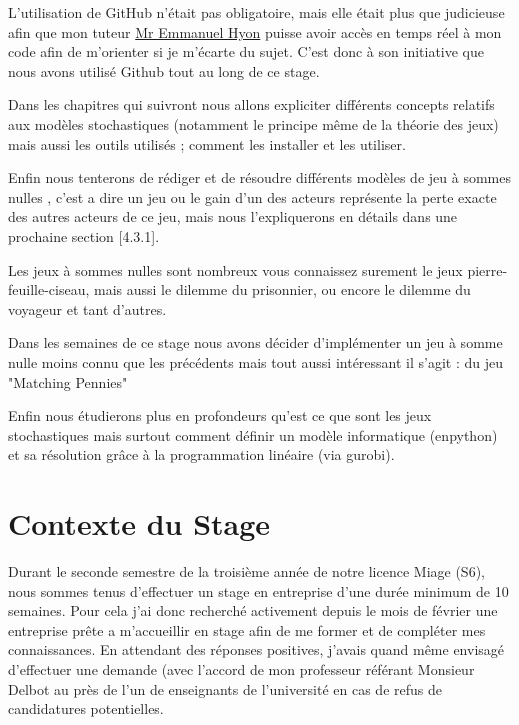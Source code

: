 \documentclass[a4paper, 12pt, twoside]{article}
\begin{document}
L'utilisation de \textsf{GitHub} n'était pas obligatoire, mais elle était plus que judicieuse afin que mon tuteur \underline{\textsf{Mr Emmanuel Hyon}} puisse avoir accès en temps réel à mon code afin de m'orienter si je m'écarte du sujet. C'est donc à son initiative que nous avons utilisé \textsf{Github} tout au long de ce stage. \newline

Dans les chapitres qui suivront nous allons expliciter différents concepts relatifs aux \textsf{ modèles stochastiques} (notamment le principe même de la théorie des jeux) mais aussi les outils utilisés ; comment les installer et les utiliser. \newline

Enfin nous tenterons de rédiger et de résoudre différents modèles de \textsf{jeu à sommes nulles} , c'est a dire un jeu ou le gain d'un des acteurs représente la perte exacte des autres acteurs de ce jeu, mais nous l'expliquerons en détails dans une prochaine section [4.3.1].  \newline

Les \textsf{jeux à sommes nulles} sont nombreux vous connaissez surement le jeux \textsf{pierre-feuille-ciseau}, mais aussi le \textsf{dilemme du prisonnier}, ou encore le \textsf{dilemme du voyageur} et tant d'autres. \newline

Dans les semaines de ce stage nous avons décider d'implémenter un \textsf{jeu à somme nulle} moins connu que les précédents mais tout aussi intéressant il s'agit : du jeu  \textsf{ "Matching Pennies"}\newline

Enfin nous étudierons plus en profondeurs qu'est ce que sont les jeux stochastiques mais surtout comment définir un modèle informatique (en\textsf{python}) et sa résolution grâce à la programmation linéaire (via \textsf{gurobi}).

\newpage
\section{Contexte du Stage}
Durant le seconde semestre de la troisième année de notre licence Miage (S6), nous sommes tenus d'effectuer un stage en entreprise d'une durée minimum de 10 semaines. Pour cela j'ai donc recherché activement depuis le mois de février une entreprise prête a m'accueillir en stage afin de me former et de compléter mes connaissances. En attendant des réponses positives, j'avais quand même envisagé d'effectuer une demande (avec l'accord de mon professeur référant \textsf{Monsieur Delbot} au près de l'un de enseignants de l'université en cas de refus de candidatures potentielles. \newline
\end{document}
